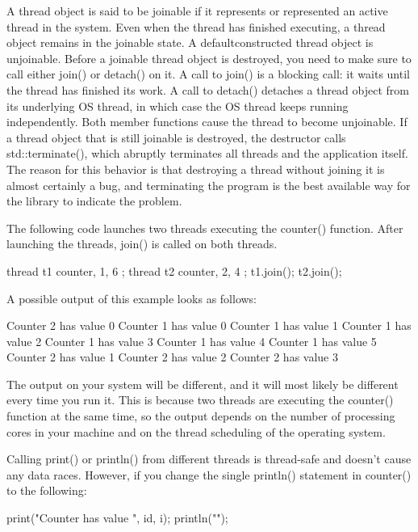 A thread object is said to be joinable if it represents or represented an active thread in the system.
Even when the thread has finished executing, a thread object remains in the joinable state. A defaultconstructed thread object is unjoinable. Before a joinable thread object is destroyed, you need to make sure to call either join() or detach() on it. A call to join() is a blocking call: it waits until the thread has finished its work. A call to detach() detaches a thread object from its underlying OS thread, in which case the OS thread keeps running independently. Both member functions cause the thread to become unjoinable. If a thread object that is still joinable is destroyed, the destructor calls std::terminate(), which abruptly terminates all threads and the application itself. The reason for this behavior is that destroying a thread without joining it is almost certainly a bug, and terminating the program is the best available way for the library to indicate the problem.

The following code launches two threads executing the counter() function. After launching the threads, join() is called on both threads.

\begin{cpp}
thread t1 { counter, 1, 6 };
thread t2 { counter, 2, 4 };
t1.join();
t2.join();
\end{cpp}

A possible output of this example looks as follows:

\begin{shell}
Counter 2 has value 0
Counter 1 has value 0
Counter 1 has value 1
Counter 1 has value 2
Counter 1 has value 3
Counter 1 has value 4
Counter 1 has value 5
Counter 2 has value 1
Counter 2 has value 2
Counter 2 has value 3
\end{shell}

The output on your system will be different, and it will most likely be different every time you run it. This is because two threads are executing the counter() function at the same time, so the output depends on the number of processing cores in your machine and on the thread scheduling of the operating system.

Calling print() or println() from different threads is thread-safe and doesn’t cause any data races. However, if you change the single println() statement in counter() to the following:

\begin{cpp}
print("Counter {} has value {}", id, i);
println("");
\end{cpp}

